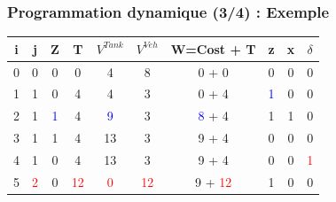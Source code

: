 \documentclass[hyperref={bookmarks=false},aspectratio=169]{beamer}
\begin{document}
\begin{frame}
	\frametitle{Programmation dynamique (3/4) : Exemple}

\begin{table}[H]
	\centering
	\begin{tabular}{|c|c||c|c|c|c||c||c|c|c|}
		\hline
		i & j & Z &T & $V^{Tank}$ & $V^{Veh}$&W=Cost + T & z & x&$\delta$ \\ 
		\hline
		0 & 0 & 0 &0 & 4 & 8&0 + 0 & 0 & \textcolor{greenn}{0}&0 \\ 
		\hline
		1 &\textcolor{greenn}{1} & 0 &\textcolor{greenn}{4} & 4 & \textcolor{greenn}{3}&0 + \textcolor{greenn}{4} & \textcolor{blue}{1} & 0&0 \\ 
		\hline
		2 &1 & \textcolor{blue}{1} &4 & \textcolor{blue}{9} & 3&\textcolor{blue}{8} + 4 & 1 & 1&0 \\ 
		\hline
		3 &1 & 1 &4 & 13 & 3&9 + 4 & 0 &0&0 \\ 
		\hline
		4 &1 & 0 &4 & 13 & 3&9 + 4 & 0 & 0&\textcolor{red}{1} \\ 
		\hline
		5 &\textcolor{red}{2} & 0 &\textcolor{red}{12} & \textcolor{red}{0} & \textcolor{red}{12}&9 + \textcolor{red}{12} & 1 & 0&0 \\ 
		\hline

		\hline
		
	\end{tabular}
	\label{Simulation_synchro}
\end{table}


\end{frame}
\end{document}
